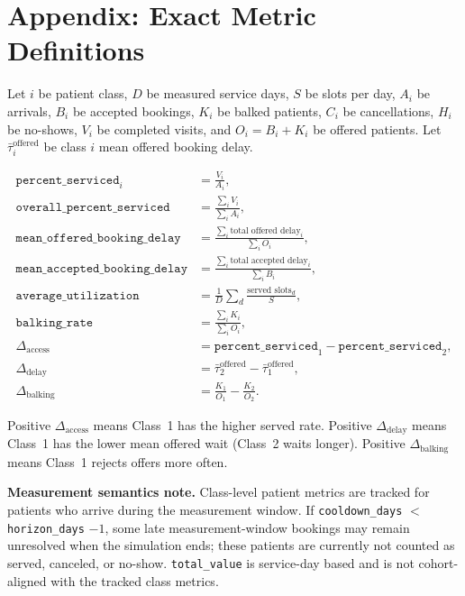 \documentclass[11pt]{article}
\begin{document}
\section{Appendix: Exact Metric Definitions}

Let $i$ be patient class, $D$ be measured service days, $S$ be slots per
day, $A_i$ be arrivals, $B_i$ be accepted bookings, $K_i$ be balked patients,
$C_i$ be cancellations, $H_i$ be no-shows, $V_i$ be completed visits, and
$O_i = B_i + K_i$ be offered patients. Let $\bar{\tau}^{\text{offered}}_i$
be class $i$ mean offered booking delay.

\begin{align*}
\texttt{percent\_serviced}_i &= \frac{V_i}{A_i}, \\
\texttt{overall\_percent\_serviced} &= \frac{\sum_i V_i}{\sum_i A_i}, \\
\texttt{mean\_offered\_booking\_delay} &= \frac{\sum_i \text{total offered delay}_i}{\sum_i O_i}, \\
\texttt{mean\_accepted\_booking\_delay} &= \frac{\sum_i \text{total accepted delay}_i}{\sum_i B_i}, \\
\texttt{average\_utilization} &= \frac{1}{D}\sum_d \frac{\text{served slots}_d}{S}, \\
\texttt{balking\_rate} &= \frac{\sum_i K_i}{\sum_i O_i}, \\
\Delta_{\text{access}} &= \texttt{percent\_serviced}_1 - \texttt{percent\_serviced}_2, \\
\Delta_{\text{delay}} &= \bar{\tau}^{\text{offered}}_2 - \bar{\tau}^{\text{offered}}_1, \\
\Delta_{\text{balking}} &= \frac{K_1}{O_1} - \frac{K_2}{O_2}.
\end{align*}

\noindent Positive $\Delta_{\text{access}}$ means Class~1 has the higher
served rate. Positive $\Delta_{\text{delay}}$ means Class~1 has the lower
mean offered wait (Class~2 waits longer). Positive $\Delta_{\text{balking}}$
means Class~1 rejects offers more often.

\noindent\textbf{Measurement semantics note.} Class-level patient metrics
are tracked for patients who arrive during the measurement window. If
\texttt{cooldown\_days} $<$ \texttt{horizon\_days} $- 1$, some late
measurement-window bookings may remain unresolved when the simulation ends;
these patients are currently not counted as served, canceled, or no-show.
\texttt{total\_value} is service-day based and is not cohort-aligned with
the tracked class metrics.
\end{document}
